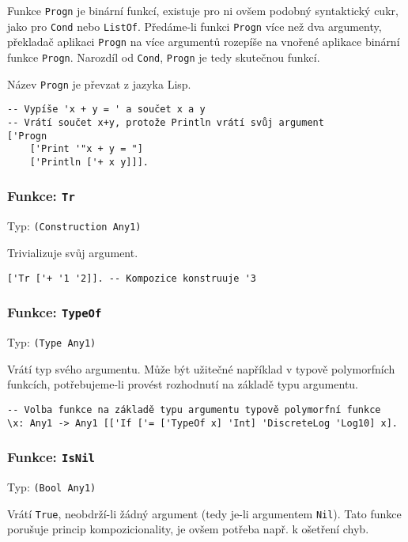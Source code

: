 Funkce \lstinline{Progn} je binární funkcí, existuje pro ni ovšem podobný syntaktický cukr, jako pro
\lstinline{Cond} nebo \lstinline{ListOf}. Předáme-li funkci \lstinline{Progn} více než dva
argumenty, překladač aplikaci \lstinline{Progn} na více argumentů rozepíše na vnořené aplikace
binární funkce \lstinline{Progn}. Narozdíl od \lstinline{Cond}, \lstinline{Progn} je tedy
skutečnou funkcí.

Název \lstinline{Progn} je převzat z jazyka Lisp.

\begin{lstlisting}[caption={Ukázka využití Progn}]
-- Vypíše 'x + y = ' a součet x a y
-- Vrátí součet x+y, protože Println vrátí svůj argument
['Progn
    ['Print '"x + y = "]
    ['Println ['+ x y]]].
\end{lstlisting}

\subsubsection*{Funkce: \lstinline{Tr}}
Typ: \lstinline{(Construction Any1)}

Trivializuje svůj argument.

\begin{lstlisting}[caption={Ukázka využití Tr}]
['Tr ['+ '1 '2]]. -- Kompozice konstruuje '3
\end{lstlisting}

\subsubsection*{Funkce: \lstinline{TypeOf}}
Typ: \lstinline{(Type Any1)}

Vrátí typ svého argumentu. Může být užitečné například v typově polymorfních funkcích,
potřebujeme-li provést rozhodnutí na základě typu argumentu.

\begin{lstlisting}[caption={Ukázka využití TypeOf}]
-- Volba funkce na základě typu argumentu typově polymorfní funkce
\x: Any1 -> Any1 [['If ['= ['TypeOf x] 'Int] 'DiscreteLog 'Log10] x].
\end{lstlisting}

\subsubsection*{Funkce: \lstinline{IsNil}}
Typ: \lstinline{(Bool Any1)}

Vrátí \lstinline{True}, neobdrží-li žádný argument (tedy je-li argumentem \lstinline{Nil}). Tato
funkce porušuje princip kompozicionality, je ovšem potřeba např. k ošetření chyb.

